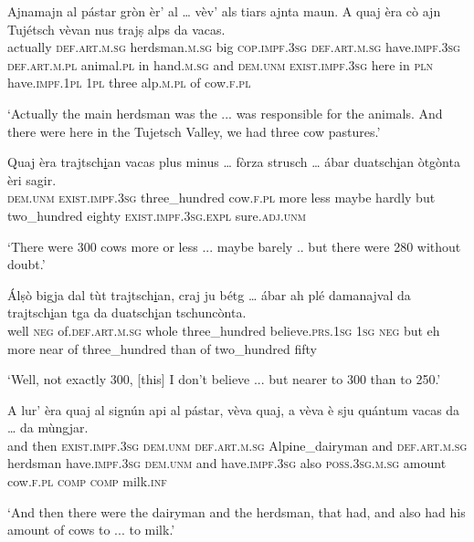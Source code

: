 \begin{linenumbers}
	\gll   Ajnamajn al pástar gròn èr’ al … vèv’ als tiars ajnta maun. A quaj èra cò ajn Tujétsch vèvan nus trajṣ alps da vacas.   \\
actually \textsc{def.art.m.sg} herdsman.\textsc{m.sg} big \textsc{cop.impf.3sg} \textsc{def.art.m.sg} {} have.\textsc{impf.3sg} \textsc{def.art.m.pl} animal.\textsc{pl} in hand.\textsc{m.sg} and \textsc{dem.unm} \textsc{exist.impf.3sg} here in \textsc{pln} have.\textsc{impf.1pl} \textsc{1pl} three alp.\textsc{m.pl} of cow.\textsc{f.pl}	\\
\end{linenumbers}
\medskip
\glt `Actually the main herdsman was the ... was responsible for the animals. And there were here in the Tujetsch Valley, we had three cow pastures.'
\medskip

\begin{linenumbers}
	\gll  Quaj èra trajtsch\underline{i}an vacas plus minus … fòrza strusch … ábar duatsch\underline{i}an òtgònta èri sagir.  \\
	\textsc{dem.unm} \textsc{exist.impf.3sg} three\_hundred cow.\textsc{f.pl} more less {} maybe hardly {} but two\_hundred eighty \textsc{exist.impf.3sg.expl} sure.\textsc{adj.unm} \\
\end{linenumbers}
\medskip
\glt `There were 300 cows more or less ... maybe barely .. but there were 280 without doubt.'
\medskip

\begin{linenumbers}
	\gll Álṣò bigja dal tùt trajtsch\underline{i}an, craj ju bétg … ábar ah plé damanajval da trajtsch\underline{i}an tga da duatsch\underline{i}an tschuncònta.   \\
well \textsc{neg} of.\textsc{def.art.m.sg} whole three\_hundred believe.\textsc{prs.1sg} \textsc{1sg} \textsc{neg} {} but eh more near of three\_hundred than of two\_hundred fifty\\
\end{linenumbers}
\medskip
\glt `Well, not exactly 300, [this] I don't believe ... but nearer to 300 than to 250.'
\medskip

\begin{linenumbers}
	\gll A lur’ èra quaj al signún api al pástar, vèva quaj, a vèva è sju quántum vacas da … da mùngjar.\\
	and then \textsc{exist.impf.3sg} \textsc{dem.unm} \textsc{def.art.m.sg} Alpine\_dairyman and \textsc{def.art.m.sg} herdsman have.\textsc{impf.3sg } \textsc{dem.unm} and have.\textsc{impf.3sg} also \textsc{poss.3sg.m.sg} amount cow.\textsc{f.pl} \textsc{comp} {} \textsc{comp} milk.\textsc{inf}\\
\end{linenumbers}
\medskip
\glt `And then there were the dairyman and the herdsman, that had, and also had his amount of cows to ... to milk.'
\medskip

